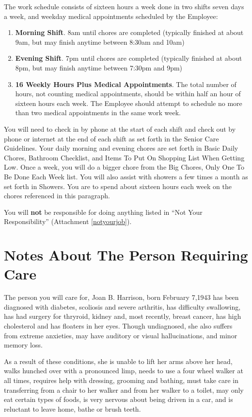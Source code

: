 \documentclass[]{article}
\newcommand{\mom}{Joan B. Harrison}
\newcommand{\rules}{Senior Care Guidelines}
\newcommand{\basic}{Basic Daily Chores}
\newcommand{\bathroom}{Bathroom Checklist}
\newcommand{\shopping}{Items To Put On Shopping List When Getting Low}
\newcommand{\bigchores}{Big Chores, Only One To Be Done Each Week}
\newcommand{\shower}{Showers}
\newcommand{\notyourjob}{Not Your Responsibility}
\begin{document}
The work schedule consists of sixteen hours a week done in two shifts seven days a week, and weekday medical appointments scheduled by the Employee:
\begin{enumerate}
	\item \textbf{Morning Shift}. 8am until chores are completed (typically finished at about 9am, but may finish anytime between 8:30am and 10am)
	\item \textbf{Evening Shift}. 7pm until chores are completed (typically finished at about 8pm, but may finish anytime between 7:30pm and 9pm)
	\item \textbf{16 Weekly Hours Plus Medical Appointments}. The total number of hours, not counting medical appointments, should be within half an hour of sixteen hours each week. The Employee should attempt to schedule no more than two medical appointments in the same work week. 
\end{enumerate}

You will need to check in by phone at the start of each shift and check out by phone or internet at the end of each shift as set forth in the \rules{}. Your daily morning and evening chores are set forth in \basic{}, \bathroom{}, and \shopping{}. Once a week, you will do a bigger chore from the \bigchores{} list. You will also assist with showers a few times a month as set forth in \shower{}. You are to spend about sixteen hours each week on the chores referenced in this paragraph.

You will \textbf{not} be responsible for doing anything listed in ``\notyourjob{}'' (Attachment \ref{notyourjob}). 

\section{Notes About The Person Requiring Care}

The person you will care for, \mom{}, born February 7,1943 has been diagnosed with diabetes, scoliosis and severe arthritis, has difficulty swallowing, has had surgery for thryroid, kidney and, most recently, breast cancer, has high cholesterol and has floaters in her eyes. Though undiagnosed, she also suffers from extreme anxieties, may have auditory or visual hallucinations, and minor memory loss.

As a result of these conditions, she is unable to lift her arms above her head, walks hunched over with a pronounced limp, needs to use a four wheel walker at all times, requires help with dressing, grooming and bathing, must take care in transferring from a chair to her walker and from her walker to a toilet, may only eat certain types of foods, is very nervous about being driven in a car, and is reluctant to leave home, bathe or brush teeth.
\end{document}
